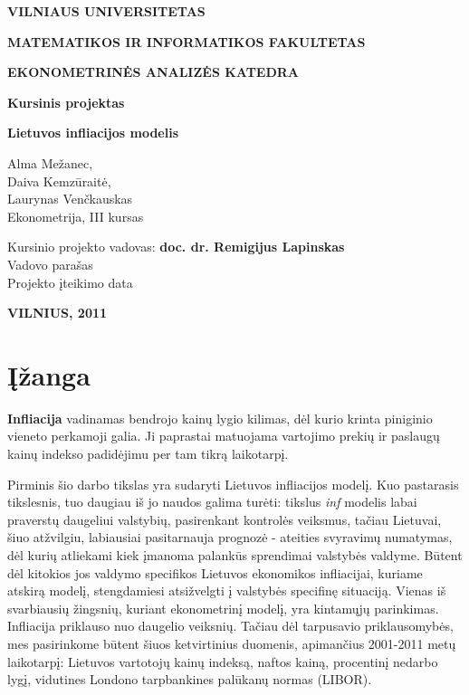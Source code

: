 \documentclass[a4paper]{article}
\begin{document}
\begin{titlepage}

\vskip 20pt
\centerline{\bf \large VILNIAUS UNIVERSITETAS}
\bigskip
\centerline{\large \textbf{MATEMATIKOS IR INFORMATIKOS FAKULTETAS}}
\bigskip
\centerline{\large \textbf{EKONOMETRINĖS ANALIZĖS KATEDRA}}
\vskip 120pt
\centerline{\bf \Large \textbf{Kursinis projektas}}
\vskip 50pt

\begin{center}
{\bf \LARGE Lietuvos infliacijos modelis}
\end{center}

\bigskip
\begin{center}
\large Alma Mežanec, \\
\large Daiva Kemzūraitė,	\\
\large Laurynas Venčkauskas\\
\bigskip
\large Ekonometrija, III kursas
\end{center}
\vskip 90pt
\begin{flushleft}
\large Kursinio projekto vadovas: \textbf{doc. dr. Remigijus Lapinskas}\\
\large Vadovo parašas \underline{\hskip 114pt}\\
\large Projekto įteikimo data \underline{\hskip 114pt}
\end{flushleft}
\vfill
\centerline{\large \textbf{VILNIUS, 2011}}
\end{titlepage}

\tableofcontents
\newpage

\section{Įžanga} \indent 

\textbf{Infliacija} vadinamas bendrojo kainų lygio kilimas, dėl kurio krinta piniginio vieneto perkamoji galia. Ji paprastai matuojama vartojimo prekių ir paslaugų kainų indekso padidėjimu per tam tikrą laikotarpį.

Pirminis šio darbo tikslas yra sudaryti Lietuvos infliacijos modelį. Kuo pastarasis tikslesnis, tuo daugiau iš jo naudos galima turėti: tikslus \textit{inf} modelis labai praverstų daugeliui valstybių, pasirenkant kontrolės veiksmus, tačiau Lietuvai, šiuo atžvilgiu, labiausiai pasitarnauja prognozė - ateities svyravimų numatymas, dėl kurių atliekami kiek įmanoma palankūs sprendimai valstybės valdyme. Būtent dėl kitokios jos valdymo specifikos Lietuvos ekonomikos infliacijai, kuriame atskirą modelį, stengdamiesi atsižvelgti į valstybės specifinę situaciją. Vienas iš svarbiausių žingsnių, kuriant ekonometrinį modelį, yra kintamųjų parinkimas. Infliacija priklauso nuo daugelio veiksnių. Tačiau dėl tarpusavio priklausomybės, mes pasirinkome būtent šiuos ketvirtinius duomenis, apimančius 2001-2011 metų laikotarpį: Lietuvos vartotojų kainų indeksą, naftos kainą, procentinį nedarbo lygį, vidutines Londono tarpbankines palūkanų normas (LIBOR).
\end{document}
